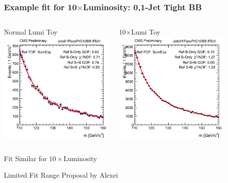 \documentclass{beamer}
\begin{document}
\begin{frame}
\frametitle{Example fit for 10$\times$Luminosity: 0,1-Jet Tight BB}
\vspace{-1em}
\begin{columns}[c]
 \column{60mm}
    \begin{center}
      Normal Lumi Toy  \\
      \includegraphics[height=55mm]{oneXeventsToys/debug_SumExp_Jets01PassPtG10BB_8TeV_125_job0_Toy0.png}
    \end{center}
 \column{60mm}
    \begin{center}
      10$\times$Lumi Toy \\
      \includegraphics[height=55mm]{tenXeventsToys/debug_SumExp_Jets01PassPtG10BB_8TeV_125_job0_Toy0.png}
    \end{center}
\end{columns}
\begin{center}
  Fit Similar for $10\times$Luminosity
\end{center}
\end{frame}

\begin{frame}
  \begin{center}
    \Huge
    Limited Fit Range Proposal by Alexei
  \end{center}
\end{frame}
\end{document}
